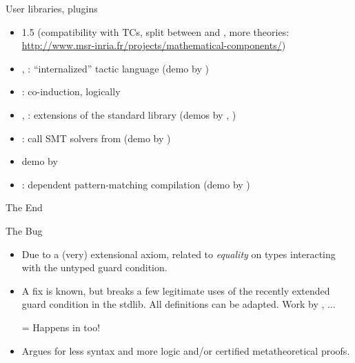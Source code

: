 

\begin{subsecframe}{User libraries, plugins}

  \begin{itemize}
  \item {} 1.5 (compatibility with TCs, split between
     and , more theories: \url{http://www.msr-inria.fr/projects/mathematical-components/})
  \item {}, : ``internalized'' tactic language
    (demo by )
  \item {}: co-induction, logically
  \item {}, : extensions of the standard library
    (demos by , )
  \item {}: call SMT solvers from \Coq (demo by )
  \item {} demo by 
  \item {}: dependent pattern-matching compilation (demo
    by )
  \end{itemize}
  
\end{subsecframe}

\begin{subsecframe}{The End}
  \begin{center}
  \end{center}
\end{subsecframe}

\begin{subsecframe}{The Bug}
  \begin{itemize}
  \item Due to a (very) extensional axiom, related to \emph{equality} on
    types interacting with the untyped guard condition.
  \item A fix is known, but breaks a few legitimate uses of the recently
    extended guard condition in the stdlib. All definitions can be
    adapted. Work by , $\ldots$
  \item[=] Happens in  too!
  \item Argues for less syntax and more logic and/or
    certified metatheoretical proofs.
  \end{itemize}
\end{subsecframe}




